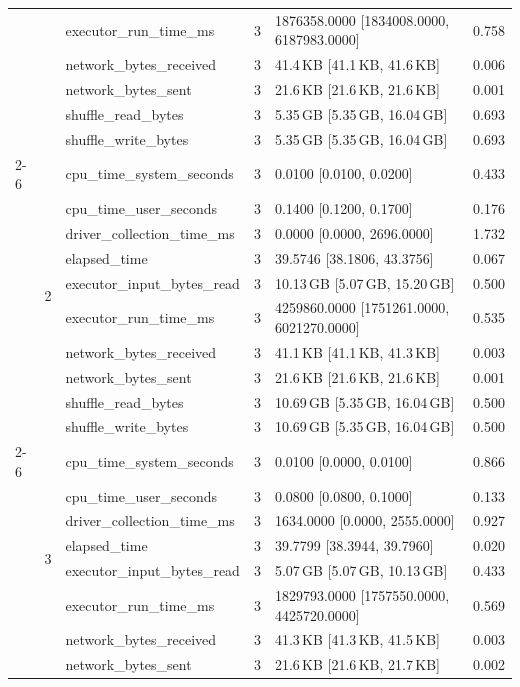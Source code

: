 \begin{tabular}{lllrll}
 &  & executor_run_time_ms & 3 & 1876358.0000 [1834008.0000, 6187983.0000] & 0.758 \\
 &  & network_bytes_received & 3 & 41.4\,KB [41.1\,KB, 41.6\,KB] & 0.006 \\
 &  & network_bytes_sent & 3 & 21.6\,KB [21.6\,KB, 21.6\,KB] & 0.001 \\
 &  & shuffle_read_bytes & 3 & 5.35\,GB [5.35\,GB, 16.04\,GB] & 0.693 \\
 &  & shuffle_write_bytes & 3 & 5.35\,GB [5.35\,GB, 16.04\,GB] & 0.693 \\
\cline{2-6}
 & \multirow[t]{10}{*}{2} & cpu_time_system_seconds & 3 & 0.0100 [0.0100, 0.0200] & 0.433 \\
 &  & cpu_time_user_seconds & 3 & 0.1400 [0.1200, 0.1700] & 0.176 \\
 &  & driver_collection_time_ms & 3 & 0.0000 [0.0000, 2696.0000] & 1.732 \\
 &  & elapsed_time & 3 & 39.5746 [38.1806, 43.3756] & 0.067 \\
 &  & executor_input_bytes_read & 3 & 10.13\,GB [5.07\,GB, 15.20\,GB] & 0.500 \\
 &  & executor_run_time_ms & 3 & 4259860.0000 [1751261.0000, 6021270.0000] & 0.535 \\
 &  & network_bytes_received & 3 & 41.1\,KB [41.1\,KB, 41.3\,KB] & 0.003 \\
 &  & network_bytes_sent & 3 & 21.6\,KB [21.6\,KB, 21.6\,KB] & 0.001 \\
 &  & shuffle_read_bytes & 3 & 10.69\,GB [5.35\,GB, 16.04\,GB] & 0.500 \\
 &  & shuffle_write_bytes & 3 & 10.69\,GB [5.35\,GB, 16.04\,GB] & 0.500 \\
\cline{2-6}
 & \multirow[t]{10}{*}{3} & cpu_time_system_seconds & 3 & 0.0100 [0.0000, 0.0100] & 0.866 \\
 &  & cpu_time_user_seconds & 3 & 0.0800 [0.0800, 0.1000] & 0.133 \\
 &  & driver_collection_time_ms & 3 & 1634.0000 [0.0000, 2555.0000] & 0.927 \\
 &  & elapsed_time & 3 & 39.7799 [38.3944, 39.7960] & 0.020 \\
 &  & executor_input_bytes_read & 3 & 5.07\,GB [5.07\,GB, 10.13\,GB] & 0.433 \\
 &  & executor_run_time_ms & 3 & 1829793.0000 [1757550.0000, 4425720.0000] & 0.569 \\
 &  & network_bytes_received & 3 & 41.3\,KB [41.3\,KB, 41.5\,KB] & 0.003 \\
 &  & network_bytes_sent & 3 & 21.6\,KB [21.6\,KB, 21.7\,KB] & 0.002 \\

\end{tabular}
